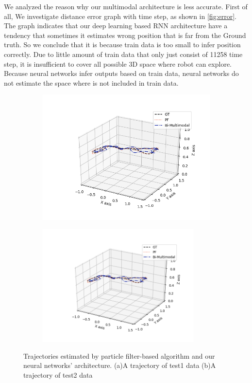 \documentclass[letterpaper, 10 pt, conference]{ieeeconf}  %
\begin{document}
 We analyzed the reason why our multimodal architecture is less accurate. First of all, We investigate distance error graph with time step, as shown in \ref{fig:error}. The graph indicates that our deep learning based RNN architecture have a tendency that sometimes it estimates wrong position that is far from the Ground truth. So we conclude that it is because train data is too small to infer position correctly. Due to little amount of train data that only just consist of 11258 time step, it is insufficient to cover all possible 3D space where robot can explore. Because neural networks infer outputs based on train data, neural networks do not estimate the space where is not included in train data. 
 
 
 \begin{figure}[h]
 	\centering
 	\begin{subfigure}[b]{.50\textwidth}
 		\centering
 		\includegraphics[width=.9\textwidth]{PF_multimodal_comparison2}
 		\label{fig:trajectory1} 	
 		\caption{}
 	\end{subfigure}%
 	\begin{subfigure}[b]{.50\textwidth}
 		\centering
 		\includegraphics[width=0.9\textwidth]{PF_multimodal_comparison2}
 		\label{fig:trajectory2} 	
 		\caption{}
 	\end{subfigure}
 	\caption{Trajectories estimated by particle filter-based algorithm and our neural networks' architecture. (a)A trajectory of test1 data (b)A trajectory of test2 data}
 	\label{fig:trajectory}
 \end{figure} 
 
\end{document}
